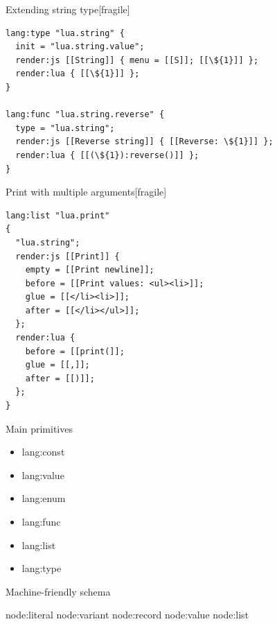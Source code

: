 \documentclass[handout]{beamer}
\begin{document}
\begin{frame}{Extending string type}[fragile]

\begin{verbatim}
lang:type "lua.string" {
  init = "lua.string.value";
  render:js [[String]] { menu = [[S]]; [[\${1}]] };
  render:lua { [[\${1}]] };
}

lang:func "lua.string.reverse" {
  type = "lua.string";
  render:js [[Reverse string]] { [[Reverse: \${1}]] };
  render:lua { [[(\${1}):reverse()]] };
}
\end{verbatim}

\end{frame}


\begin{frame}{Print with multiple arguments}[fragile]

\begin{verbatim}
lang:list "lua.print"
{
  "lua.string";
  render:js [[Print]] {
    empty = [[Print newline]];
    before = [[Print values: <ul><li>]];
    glue = [[</li><li>]];
    after = [[</li></ul>]];
  };
  render:lua {
    before = [[print(]];
    glue = [[,]];
    after = [[)]];
  };
}
\end{verbatim}

\end{frame}


\begin{frame}{Main primitives}

\begin{itemize}
\item lang:const
\item lang:value
\item lang:enum
\item lang:func
\item lang:list
\item lang:type
\end{itemize}

\end{frame}


\begin{frame}{Machine-friendly schema}

\begin{itemize}
node:literal
node:variant
node:record
node:value
node:list
\end{itemize}

\end{frame}
\end{document}
